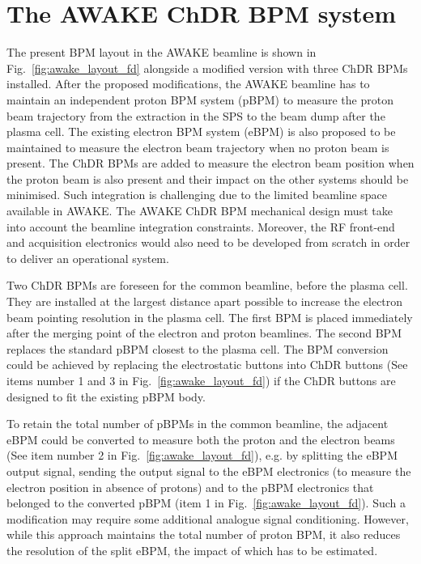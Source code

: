 \section[The AWAKE ChDR BPM system]{The AWAKE ChDR BPM system}\label{sec:fd_AWAKE}

The present BPM layout in the AWAKE beamline is shown in Fig.~\ref{fig:awake_layout_fd} alongside a modified version with three ChDR BPMs installed. After the proposed modifications, the AWAKE beamline has to maintain an independent proton BPM system (pBPM) to measure the proton beam trajectory from the extraction in the SPS to the beam dump after the plasma cell. The existing electron BPM system (eBPM) is also proposed to be maintained to measure the electron beam trajectory when no proton beam is present. The ChDR BPMs are added to measure the electron beam position when the proton beam is also present and their impact on the other systems should be minimised. Such integration is challenging due to the limited beamline space available in AWAKE. The AWAKE ChDR BPM mechanical design must take into account the beamline integration constraints. Moreover, the RF front-end and acquisition electronics would also need to be developed from scratch in order to deliver an operational system. 


Two ChDR BPMs are foreseen for the common beamline, before the plasma cell. They are installed at the largest distance apart possible to increase the electron beam pointing resolution in the plasma cell. The first BPM is placed immediately after the merging point of the electron and proton beamlines. The second BPM replaces the standard pBPM closest to the plasma cell. The BPM conversion could be achieved by replacing the electrostatic buttons into ChDR buttons (See items number 1 and 3 in Fig.~\ref{fig:awake_layout_fd}) if the ChDR buttons are designed to fit the existing pBPM body.

To retain the total number of pBPMs in the common beamline, the adjacent eBPM could be converted to measure both the proton and the electron beams (See item number 2 in Fig.~\ref{fig:awake_layout_fd}), e.g. by splitting the eBPM output signal, sending the output signal to the eBPM electronics (to measure the electron position in absence of protons) and to the pBPM electronics that belonged to the converted pBPM (item 1 in Fig.~\ref{fig:awake_layout_fd}). Such a modification may require some additional analogue signal conditioning. However, while this approach maintains the total number of proton BPM, it also reduces the resolution of the split eBPM, the impact of which has to be estimated. 

